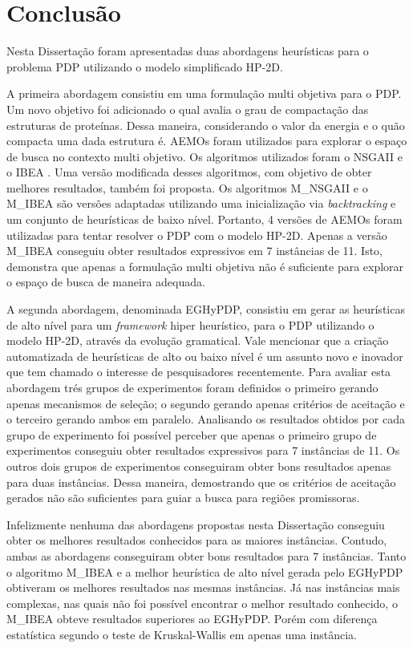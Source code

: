 \chapter{Conclusão}
\label{cap:conclusao}


Nesta Dissertação foram apresentadas duas abordagens heurísticas para o problema PDP utilizando o modelo simplificado HP-2D. 

A primeira abordagem consistiu em uma formulação multi objetiva para o PDP. Um novo objetivo foi adicionado o qual avalia o grau de compactação das estruturas de proteínas. Dessa maneira, considerando o valor da energia e o quão compacta uma dada estrutura é. AEMOs foram utilizados para explorar o espaço de busca no contexto multi objetivo. Os algoritmos utilizados foram o NSGAII \cite{deb2002} e o IBEA \cite{zitzler2004indicator}. Uma versão modificada desses algoritmos, com objetivo de obter melhores resultados, também foi proposta. Os algoritmos M\_NSGAII e o M\_IBEA são versões adaptadas utilizando uma inicialização via \textit{backtracking}  e um conjunto de heurísticas de baixo nível. Portanto, 4 versões de AEMOs foram utilizadas para tentar resolver o PDP com o modelo HP-2D. Apenas a versão M\_IBEA conseguiu obter resultados expressivos em 7 instâncias de 11. Isto, demonstra que apenas a formulação multi objetiva não é suficiente para explorar o espaço de busca de maneira adequada.  


A segunda abordagem, denominada EGHyPDP, consistiu em gerar as heurísticas de alto nível para um \textit{framework} hiper heurístico, para o PDP utilizando o modelo HP-2D, através da evolução gramatical. Vale mencionar que a criação automatizada de heurísticas de alto ou baixo nível é um assunto novo e inovador que tem chamado o interesse de pesquisadores recentemente. Para avaliar esta abordagem trés grupos de experimentos foram definidos o primeiro gerando apenas mecanismos de seleção; o segundo gerando apenas critérios de aceitação e o terceiro gerando ambos em paralelo. Analisando os resultados obtidos por cada grupo de experimento foi possível perceber que apenas o primeiro grupo de experimentos conseguiu obter resultados expressivos para 7 instâncias de 11. Os outros dois grupos de experimentos conseguiram obter bons resultados apenas para duas instâncias. Dessa maneira, demostrando que os critérios de aceitação gerados não são suficientes para guiar a busca para regiões promissoras. 

Infelizmente nenhuma das abordagens propostas nesta Dissertação conseguiu obter os melhores resultados conhecidos para as maiores instâncias. Contudo, ambas as abordagens conseguiram obter bons resultados para 7 instâncias. Tanto o algoritmo M\_IBEA e a melhor heurística de alto nível gerada pelo EGHyPDP obtiveram os melhores resultados nas mesmas instâncias. Já nas instâncias mais complexas, nas quais não foi possível encontrar o melhor resultado conhecido, o M\_IBEA obteve resultados superiores ao EGHyPDP. Porém com diferença estatística segundo o teste de Kruskal-Wallis \cite{mckight2010kruskal} em apenas uma instância.

